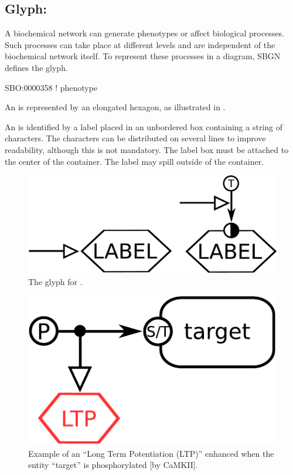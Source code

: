 
\color{red}

\subsection{Glyph: }
\label{sec:observable}

A biochemical network can generate phenotypes or affect biological
processes.  Such processes can take place at different levels and are
independent of the biochemical network itself.  To represent these
processes in a diagram, SBGN defines the  glyph.

\begin{glyphDescription}

\glyphSboTerm SBO:0000358 ! phenotype

\glyphContainer An  is represented by an elongated
hexagon, as illustrated in .

\glyphLabel An  is identified by a label placed in an
unbordered box containing a string of characters.  The characters can be
distributed on several lines to improve readability, although this is not
mandatory.  The label box must be attached to the center of the
 container.  The label may spill outside of the container.

\end{glyphDescription}
 
\begin{figure}[H]
  \centering
  \includegraphics[scale = 0.3]{images/observable}
  \caption{The \ER glyph for .}
  \label{fig:observable}
\end{figure}

\begin{figure}[H]
  \centering
  \includegraphics[scale = 0.5]{examples/ex-observable}
  \caption{Example of an  ``Long Term Potentiation (LTP)'' enhanced when the entity ``target'' is phosphorylated [by CaMKII].}
  \label{fig:ex-observable}
\end{figure}

\normalcolor
